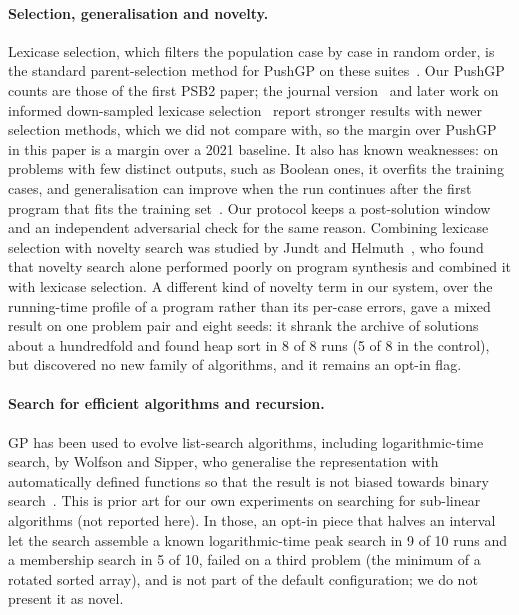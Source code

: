 \documentclass[sigconf,nonacm]{acmart}
\begin{document}
\paragraph{Selection, generalisation and novelty.}
Lexicase selection, which filters the population case by case in random order, is the standard parent-selection method for PushGP
on these suites~\cite{helmuth2015lexicase,helmuth2021psb2}. Our PushGP counts are those of the first PSB2 paper; the journal version~\cite{helmuth2022psb2} and later work on informed down-sampled lexicase selection~\cite{boldi2024informed} report stronger results with newer selection methods, which we did not compare with, so the margin over PushGP in this paper is a margin over a 2021 baseline. It also has known weaknesses: on problems with few distinct outputs, such as Boolean ones,
it overfits the training cases, and generalisation can improve when the run continues after the first program that fits the training
set~\cite{sobania2021generalizability}. Our protocol keeps a post-solution window and an
independent adversarial check for the same reason. Combining lexicase selection with novelty search was studied by Jundt and
Helmuth~\cite{jundt2019novelty}, who found that novelty search alone performed poorly on program synthesis and combined it with lexicase selection. A different kind of
novelty term in our system, over the running-time profile of a program rather than its per-case errors, gave a mixed result on one
problem pair and eight seeds: it shrank the archive of solutions about a hundredfold and found heap sort in 8 of 8 runs (5 of 8 in
the control), but discovered no new family of algorithms, and it remains an opt-in flag.

\paragraph{Search for efficient algorithms and recursion.}
GP has been used to evolve list-search algorithms, including logarithmic-time search, by Wolfson and Sipper, who generalise the representation
with automatically defined functions so that the result is not biased towards binary search~\cite{wolfson2010efficient}. This is prior art for
our own experiments on searching for sub-linear algorithms (not reported here). In those, an opt-in piece that halves an interval let the search
assemble a known logarithmic-time peak search in 9 of 10 runs and a membership search in 5 of 10, failed on a third problem (the minimum
of a rotated sorted array), and is not part of the default configuration; we do not present it as novel.
\end{document}
